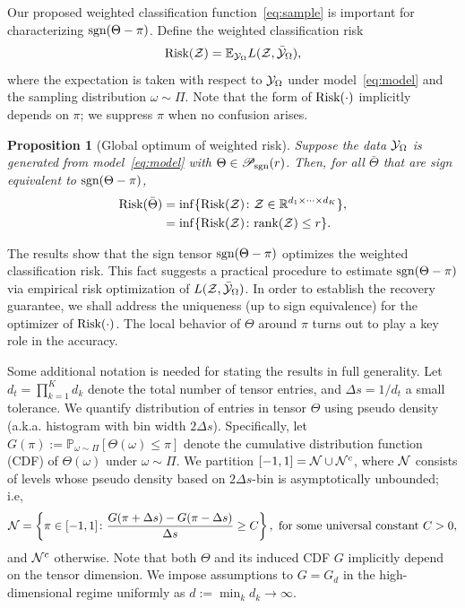 \documentclass[11pt]{article}
\theoremstyle{plain}
\newtheorem{prop}{Proposition}
\theoremstyle{definition}
\def\sign{\textup{sgn}}
\def\caliP{\mathscr{P}_{\textup{sgn}}}
\def\risk{\textup{Risk}}
\begin{document}
Our proposed weighted classification function~\eqref{eq:sample} is important for characterizing $\sign(\Theta-\pi)$. Define the weighted classification risk 
\begin{equation}\label{eq:population}
\textup{Risk}(\mathcal{Z})=\mathbb{E}_{\mathcal{Y}_\Omega}L(\mathcal{Z},\bar{\mathcal{Y}}_\Omega),
\end{equation}
where the expectation is taken with respect to $\mathcal{Y}_\Omega$ under model~\eqref{eq:model} and the sampling distribution $\omega\sim\Pi$. Note that the form of $\textup{Risk}(\cdot)$ implicitly depends on $\pi$; we suppress $\pi$ when no confusion arises. 
\begin{prop}[Global optimum of weighted risk]\label{prop:global}
Suppose the data $\mathcal{Y}_\Omega$ is generated from model~\eqref{eq:model} with $\Theta \in \caliP(r)$. Then, for all $\bar \Theta$ that are sign equivalent to $\sign(\Theta-\pi)$, 
\begin{align}\label{eq:optimal}
\textup{Risk}(\bar \Theta )&=\inf\{\textup{Risk}(\mathcal{Z})\colon \mathcal{Z}\in\mathbb{R}^{d_1\times \cdots \times d_K}\},\notag \\
&=\inf\{\textup{Risk}(\mathcal{Z})\colon \textup{rank} (\mathcal{Z})\leq r\}.
\end{align}
\end{prop}
The results show that the sign tensor $\sign(\Theta-\pi)$ optimizes the weighted classification risk. This fact suggests a practical procedure to estimate $\sign(\Theta-\pi)$ via empirical risk optimization of $L(\mathcal{Z},\bar {\mathcal{Y}}_\Omega)$. In order to establish the recovery guarantee, we shall address the uniqueness (up to sign equivalence) for the optimizer of $\risk(\cdot)$. The local behavior of $\Theta$ around $\pi$ turns out to play a key role in the accuracy. 

Some additional notation is needed for stating the results in full generality. Let $d_t=\prod^K_{k=1} d_k$ denote the total number of tensor entries, and $\Delta s = 1/d_t$ a small tolerance. We quantify distribution of entries in tensor $\Theta$ using pseudo density (a.k.a. histogram with bin width $2\Delta s$). Specifically, let $G(\pi):=\mathbb{P}_{\omega\sim \Pi}[\Theta(\omega)\leq \pi]$ denote the cumulative distribution function (CDF) of $\Theta(\omega)$ under $\omega\sim \Pi$. We partition $[-1,1]=\mathcal{N} \cup \mathcal{N}^c$, where $\mathcal{N}$ consists of levels whose pseudo density based on $2\Delta s$-bin is asymptotically unbounded; i.e,
\[
\mathcal{N}=\left\{\pi\in[-1,1] \colon {G(\pi+{\Delta s})-G(\pi-{\Delta s})\over \Delta s} \geq C \right\},\ \text{for some universal constant }C>0,
\]
and $\mathcal{N}^c$ otherwise. 
Note that both $\Theta$ and its induced CDF $G$ implicitly depend on the tensor dimension. We impose assumptions to $G=G_d$ in the high-dimensional regime uniformly as $d:=\min_k d_k \to\infty$. 
\end{document}
